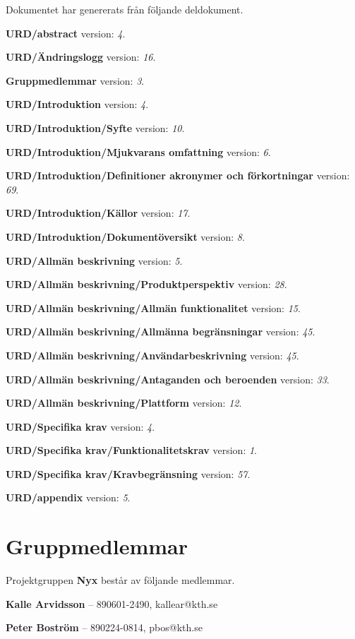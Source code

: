 \documentclass[a4paper, twoside, 11pt, titlepage]{article}
\begin{document}
Dokumentet har genererats från följande deldokument.

\textbf{URD/abstract} version: \emph{4}.

\textbf{URD/Ändringslogg} version: \emph{16}.

\textbf{Gruppmedlemmar} version: \emph{3}.

\textbf{URD/Introduktion} version: \emph{4}.

\textbf{URD/Introduktion/Syfte} version: \emph{10}.

\textbf{URD/Introduktion/Mjukvarans omfattning} version: \emph{6}.

\textbf{URD/Introduktion/Definitioner akronymer och förkortningar} version: \emph{69}.

\textbf{URD/Introduktion/Källor} version: \emph{17}.

\textbf{URD/Introduktion/Dokumentöversikt} version: \emph{8}.

\textbf{URD/Allmän beskrivning} version: \emph{5}.

\textbf{URD/Allmän beskrivning/Produktperspektiv} version: \emph{28}.

\textbf{URD/Allmän beskrivning/Allmän funktionalitet} version: \emph{15}.

\textbf{URD/Allmän beskrivning/Allmänna begränsningar} version: \emph{45}.

\textbf{URD/Allmän beskrivning/Användarbeskrivning} version: \emph{45}.

\textbf{URD/Allmän beskrivning/Antaganden och beroenden} version: \emph{33}.

\textbf{URD/Allmän beskrivning/Plattform} version: \emph{12}.

\textbf{URD/Specifika krav} version: \emph{4}.

\textbf{URD/Specifika krav/Funktionalitetskrav} version: \emph{1}.

\textbf{URD/Specifika krav/Kravbegränsning} version: \emph{57}.

\textbf{URD/appendix} version: \emph{5}.

\clearpage
\section*{Gruppmedlemmar}


Projektgruppen \textbf{Nyx} består av följande medlemmar.

\textbf{Kalle Arvidsson} -- 890601-2490, kallear@kth.se

\textbf{Peter Boström} -- 890224-0814, pbos@kth.se
\end{document}
